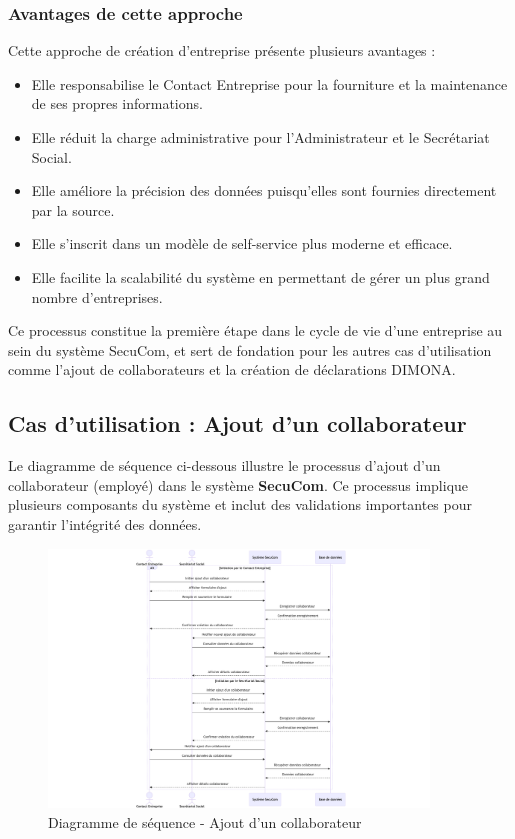 \subsubsection{Avantages de cette approche}

Cette approche de création d'entreprise présente plusieurs avantages :
\begin{itemize}
  \item Elle responsabilise le Contact Entreprise pour la fourniture et la maintenance de ses propres informations.
  \item Elle réduit la charge administrative pour l'Administrateur et le Secrétariat Social.
  \item Elle améliore la précision des données puisqu'elles sont fournies directement par la source.
  \item Elle s'inscrit dans un modèle de self-service plus moderne et efficace.
  \item Elle facilite la scalabilité du système en permettant de gérer un plus grand nombre d'entreprises.
\end{itemize}

Ce processus constitue la première étape dans le cycle de vie d'une entreprise au sein du système SecuCom, et sert de fondation pour les autres cas d'utilisation comme l'ajout de collaborateurs et la création de déclarations DIMONA.

\subsection{Cas d'utilisation : Ajout d'un collaborateur}

\noindent Le diagramme de séquence ci-dessous illustre le processus d'ajout d'un collaborateur (employé) dans le système \textbf{SecuCom}. Ce processus implique plusieurs composants du système et inclut des validations importantes pour garantir l'intégrité des données.

\begin{figure}[H]
\centering
\includegraphics[width=0.9\textwidth]{SD_creation_collaborateur.png}
\caption{Diagramme de séquence - Ajout d'un collaborateur}
\end{figure}

